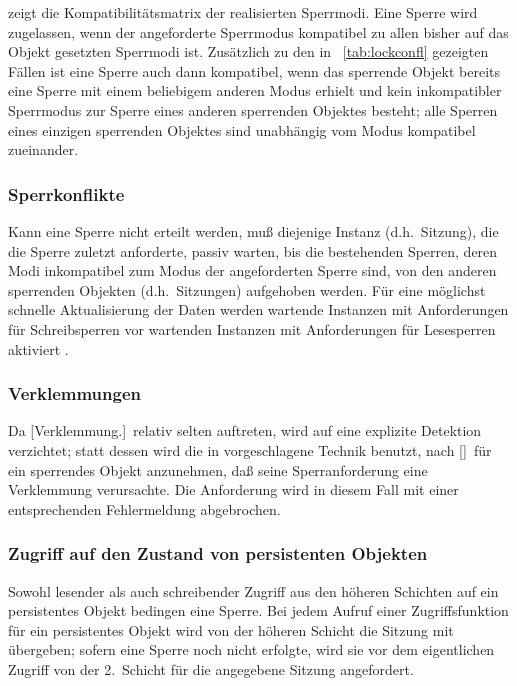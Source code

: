 %
zeigt die Kompatibilit\"{a}tsmatrix der realisierten Sperrmodi. Eine
Sperre wird zugelassen, wenn der angeforderte Sperrmodus
kompatibel zu allen bisher auf das Objekt gesetzten Sperrmodi
ist. Zus\"{a}tzlich zu den in
\tablename~\ref{tab:lockconfl} gezeigten F\"{a}llen ist eine
Sperre auch dann kompatibel, wenn das sperrende Objekt bereits eine
Sperre mit einem beliebigem anderen Modus erhielt und kein
inkompatibler Sperrmodus zur Sperre eines anderen sperrenden Objektes
besteht; alle Sperren eines einzigen sperrenden Objektes sind
un\-ab\-h\"{a}n\-gig vom Modus kompatibel zueinander.
%
\subsubsection{Sperrkonflikte}
%
Kann eine Sperre nicht erteilt werden, mu\ss{} diejenige Instanz
(d.h.\ Sitzung), die die Sperre zuletzt anforderte, passiv warten, bis
die bestehenden Sperren, deren Modi inkompatibel zum Modus der
angeforderten Sperre sind, von den anderen sperrenden Objekten
(d.h.\ Sitzungen) aufgehoben werden. F\"{u}r eine m\"{o}glichst schnelle
Aktualisierung der Daten werden wartende Instanzen mit Anforderungen
f\"{u}r Schreibsperren vor wartenden Instanzen mit Anforderungen f\"{u}r
Lesesperren aktiviert \cite[]{bib:je87}.
%
\subsubsection{Verklemmungen}
%
Da %
[Verklemmung.]\ relativ selten auftreten, wird
auf eine explizite Detektion verzichtet; statt dessen wird die in
\cite[]{bib:gr93} vorgeschlagene Technik benutzt,
nach []\ f\"{u}r ein
sperrendes Objekt anzunehmen, da\ss{} seine Sperranforderung
eine Verklemmung verursachte. Die Anforderung wird in diesem Fall mit
einer entsprechenden Fehlermeldung abgebrochen.
%
\subsubsection{Zugriff auf den Zustand von persistenten Objekten}
%
Sowohl lesender als auch schreibender Zugriff aus den h\"{o}heren
Schichten auf ein persistentes Objekt bedingen eine
Sperre. Bei jedem Aufruf einer Zugriffsfunktion f\"{u}r ein
persistentes Objekt wird von der h\"{o}heren Schicht die Sitzung mit
\"{u}bergeben;  sofern eine Sperre noch nicht erfolgte, wird sie
vor dem eigentlichen Zugriff von der 2.~Schicht f\"{u}r die angegebene
Sitzung angefordert.
%
